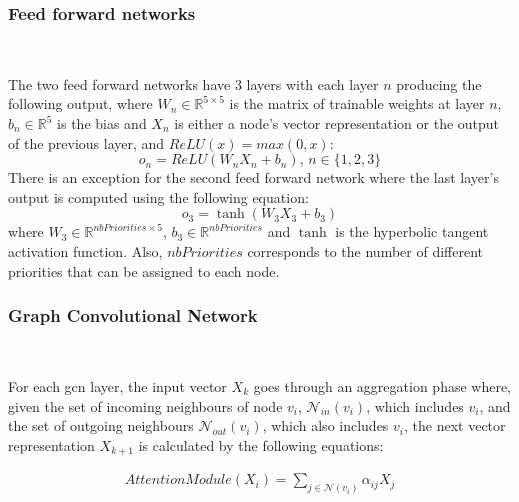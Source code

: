 \subsubsection{Feed forward networks}
~

The two feed forward networks have 3 layers with each 
layer $n$ producing the following output,
where $W_n \in \mathbb{R}^{5\times5}$ is the matrix of trainable weights
at layer $n$, $b_n \in \mathbb{R}^5$ is the bias and $X_n$ is either a node's vector representation
or the output of the previous layer, and $ReLU(x) = max(0, x)$:
\begin{equation}
    o_{n} = ReLU(W_{n}X_{n} + b_n),\, n \in \{1,2,3\}
\end{equation}
There is an exception for the second feed forward network where the last 
layer's output is computed using the following equation:
\begin{equation}
    o_{3} = \tanh(W_{3}X_{3} + b_3)
\end{equation}
where $W_3 \in \mathbb{R}^{nbPriorities \times 5}$,
$b_3 \in \mathbb{R}^{nbPriorities}$ and $\tanh$ is the 
hyperbolic tangent activation function.
Also, $nbPriorities$ corresponds to the number of different priorities
that can be assigned to each node.


\subsubsection{Graph Convolutional Network}
~


For each gcn layer, the input vector $X_k$ 
goes through an aggregation phase where,
given the set of incoming neighbours of node $v_i$, $\mathcal{N}_{in}(v_i)$, which includes
$v_i$, and the set of outgoing neighbours $\mathcal{N}_{out}(v_i)$, which also includes $v_i$,
the next vector representation $X_{k+1}$ is calculated by the following equations:

$$
\begin{array}{l}
AttentionModule(X_i) = \sum_{j \in \mathcal{N}(v_i)} \alpha_{ij} X_j
\end{array}
$$

